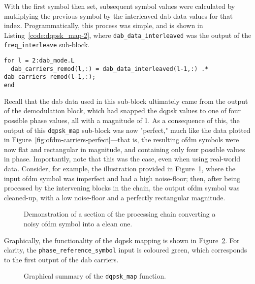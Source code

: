 \documentclass[class=report,11pt,crop=false]{standalone}
\begin{document}
With the first symbol then set, subsequent symbol values were calculated by mutliplying the previous symbol by the interleaved \gls{dab} data values for that index. Programmatically, this process was simple, and is shown in Listing~\ref{code:dqpsk_map-2}, where \texttt{dab\_data\_interleaved} was the output of the \texttt{freq\_interleave} sub-block.

\begin{lstlisting}[caption={MATLAB code for the actual \texttt{dqpsk\_map} functionality of differential modulation.},label={code:dqpsk_map-2}]
for l = 2:dab_mode.L
  dab_carriers_remod(l,:) = dab_data_interleaved(l-1,:) .* dab_carriers_remod(l-1,:);
end
\end{lstlisting}

Recall that the \gls{dab} data used in this sub-block ultimately came from the output of the demodulation block, which had snapped the \gls{dqpsk} values to one of four possible phase values, all with a magnitude of 1. As a consequence of this, the output of this \texttt{dqpsk\_map} sub-block was now "perfect," much like the data plotted in Figure~\ref{fig:ofdm-carriers-perfect}---that is, the resulting \gls{ofdm} symbols were now flat and rectangular in magnitude, and containing only four possible values in phase. Importantly, note that this was the case, even when using real-world data. Consider, for example, the illustration provided in Figure~\ref{fig:dqpsk_map-demo}, where the input \gls{ofdm} symbol was imperfect and had a high noise-floor; then, after being processed by the intervening blocks in the chain, the output \gls{ofdm} symbol was cleaned-up, with a low noise-floor and a perfectly rectangular magnitude.

\begin{figure}[htbp]
  \centering
  \captionsetup{type=figure}
  \def\svgwidth{\linewidth}
  { %
    }
  \caption{Demonstration of a section of the processing chain converting a noisy \gls{ofdm} symbol into a clean one.}
  \label{fig:dqpsk_map-demo}
\end{figure}

Graphically, the functionality of the \gls{dqpsk} mapping is shown in Figure~\ref{fig:dqpsk_map}. For clarity, the \texttt{phase\_reference\_symbol} input is coloured green, which corresponds to the first output of the \gls{dab} carriers.

\begin{figure}[htbp]
  \centering
  \captionsetup{type=figure}
  \def\svgwidth{\linewidth}
  { %
  }
  \caption{Graphical summary of the \texttt{dqpsk\_map} function.}
  \label{fig:dqpsk_map}
\end{figure}
\end{document}
